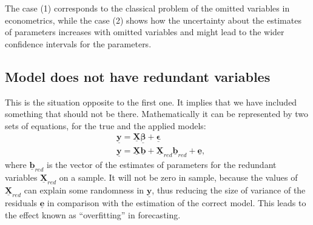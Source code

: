 \documentclass[
]{book}
\begin{document}
The case (1) corresponds to the classical problem of the omitted variables in econometrics, while the case (2) shows how the uncertainty about the estimates of parameters increases with omitted variables and might lead to the wider confidence intervals for the parameters.

\hypertarget{assumptionsSpecificationRedundant}{%
\subsection{Model does not have redundant variables}\label{assumptionsSpecificationRedundant}}

This is the situation opposite to the first one. It implies that we have included something that should not be there. Mathematically it can be represented by two sets of equations, for the true and the applied models:
\begin{equation}
    \begin{aligned}
        & \underline{\mathbf{y}} = \underline{\mathbf{X}} \underline{\boldsymbol{\beta}} + \underline{\boldsymbol{\epsilon}} \\
        & \underline{\mathbf{y}} = \underline{\mathbf{X}} \underline{\boldsymbol{b}} + \underline{\mathbf{X}}_{red} \underline{\boldsymbol{b}}_{red} + \underline{\boldsymbol{e}} ,
    \end{aligned}
    \label{eq:AssumptionsRedundantSetting}
\end{equation}
where \(\underline{\boldsymbol{b}}_{red}\) is the vector of the estimates of parameters for the redundant variables \(\underline{\mathbf{X}}_{red}\) on a sample. It will not be zero in sample, because the values of \(\underline{\mathbf{X}}_{red}\) can explain some randomness in \(\underline{\mathbf{y}}\), thus reducing the size of variance of the residuals \(\underline{\boldsymbol{e}}\) in comparison with the estimation of the correct model. This leads to the effect known as ``overfitting'' in forecasting.
\end{document}
